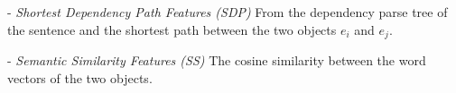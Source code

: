 - \textit{Shortest Dependency Path Features (SDP)}
From the dependency parse tree of the sentence and the shortest path 
between the two objects $e_i$ and $e_j$. 

- \textit{Semantic Similarity Features (SS)}
The cosine similarity between the word vectors of the two objects.


